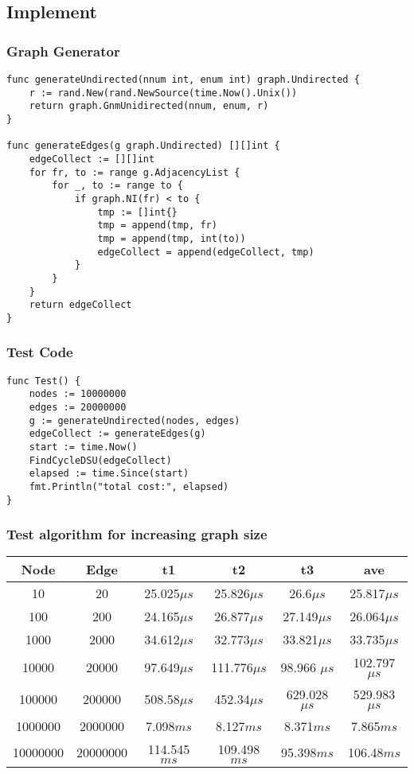 \documentclass{article}
\begin{document}
\subsection{Implement}
\subsubsection{Graph Generator}
\begin{lstlisting}
func generateUndirected(nnum int, enum int) graph.Undirected {
    r := rand.New(rand.NewSource(time.Now().Unix())
    return graph.GnmUnidirected(nnum, enum, r)
}

func generateEdges(g graph.Undirected) [][]int {
    edgeCollect := [][]int
    for fr, to := range g.AdjacencyList {
        for _, to := range to {
            if graph.NI(fr) < to {
                tmp := []int{}
                tmp = append(tmp, fr)
                tmp = append(tmp, int(to))
                edgeCollect = append(edgeCollect, tmp)
            }
        }
    }
    return edgeCollect
}
\end{lstlisting}

\subsubsection{Test Code}
\begin{lstlisting}
func Test() {
    nodes := 10000000
    edges := 20000000
    g := generateUndirected(nodes, edges)
    edgeCollect := generateEdges(g)
    start := time.Now()
    FindCycleDSU(edgeCollect)
    elapsed := time.Since(start)
    fmt.Println("total cost:", elapsed)
}
\end{lstlisting}

\subsubsection{Test algorithm for increasing graph size}
\begin{tabular}{cccccc}
\hline
Node & Edge & t1 & t2 & t3 & ave\\
\hline
10 & 20 & 25.025$\mu s$ & 25.826$\mu s$ & 26.6$\mu s$ &  25.817$\mu s$ \\
\hline
100 & 200 &  24.165$\mu s$ & 26.877$\mu s$ & 27.149$\mu s$ & 26.064$\mu s$ \\
\hline
1000 & 2000 &  34.612$\mu s$ & 32.773$\mu s$ & 33.821$\mu s$ & 33.735$\mu s$ \\
\hline
10000 & 20000 &  97.649$\mu s$ & 111.776$\mu s$ & 98.966 $\mu s$ & 102.797$\mu s$ \\
\hline
100000 & 200000 & 508.58$\mu s$ & 452.34$\mu s$ & 629.028$\mu s$ & 529.983$\mu s$ \\
\hline
1000000 & 2000000 & 7.098$ms$ & 8.127$ms$ & 8.371$ms$ & 7.865$ms$ \\
\hline
10000000 & 20000000 & 114.545$ms$ & 109.498$ms$ & 95.398$ms$ & 106.48$ms$ \\
\hline
\end{tabular}
\end{document}
